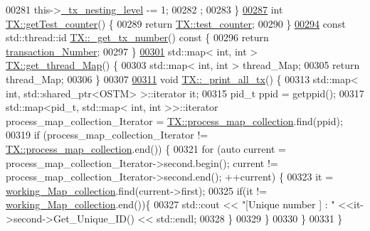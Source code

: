 \begin{DoxyCode}
00281     this->\hyperlink{class_t_x_ae8f413fd7f4fea322e7ad3c668f9898e_ae8f413fd7f4fea322e7ad3c668f9898e}{\_tx\_nesting\_level} -= 1;
00282 ;
00283 \}
\hypertarget{_t_x_8cpp_source.tex_l00287}{}\hyperlink{class_t_x_ae9bf97930c4670f59d334b345353a71e_ae9bf97930c4670f59d334b345353a71e}{00287} \textcolor{keywordtype}{int} \hyperlink{class_t_x_ae9bf97930c4670f59d334b345353a71e_ae9bf97930c4670f59d334b345353a71e}{TX::getTest\_counter}() \{
00289     \textcolor{keywordflow}{return} \hyperlink{class_t_x_a25838234aab99ae891a90eb8623a8b3c_a25838234aab99ae891a90eb8623a8b3c}{TX::test\_counter};
00290 \}
\hypertarget{_t_x_8cpp_source.tex_l00294}{}\hyperlink{class_t_x_a9eba04944d449285905b60ec47223cff_a9eba04944d449285905b60ec47223cff}{00294} \textcolor{keyword}{const} std::thread::id \hyperlink{class_t_x_a9eba04944d449285905b60ec47223cff_a9eba04944d449285905b60ec47223cff}{TX::\_get\_tx\_number}()\textcolor{keyword}{ const }\{
00296     \textcolor{keywordflow}{return} \hyperlink{class_t_x_a145a1c74b521f277fe481971a930b249_a145a1c74b521f277fe481971a930b249}{transaction\_Number};
00297 \}
\hypertarget{_t_x_8cpp_source.tex_l00301}{}\hyperlink{class_t_x_a3f5671423cb7b9f9c98f8a25f2a4b545_a3f5671423cb7b9f9c98f8a25f2a4b545}{00301} std::map< int, int > \hyperlink{class_t_x_a3f5671423cb7b9f9c98f8a25f2a4b545_a3f5671423cb7b9f9c98f8a25f2a4b545}{TX::get\_thread\_Map}() \{
00303     std::map< int, int > thread\_Map;
00305     \textcolor{keywordflow}{return} thread\_Map;
00306 \}
00307 
\hypertarget{_t_x_8cpp_source.tex_l00311}{}\hyperlink{class_t_x_a3d96ed91eb9ec73e16589f705661c5a7_a3d96ed91eb9ec73e16589f705661c5a7}{00311} \textcolor{keywordtype}{void} \hyperlink{class_t_x_a3d96ed91eb9ec73e16589f705661c5a7_a3d96ed91eb9ec73e16589f705661c5a7}{TX::\_print\_all\_tx}() \{
00313     std::map< int, std::shared\_ptr<OSTM> >::iterator it;
00315     pid\_t ppid = getppid();
00317     std::map<pid\_t, std::map< int, int >>::iterator process\_map\_collection\_Iterator = 
      \hyperlink{class_t_x_a2e3cd2f52fd93cf6ef3eb3c1cb830b9f_a2e3cd2f52fd93cf6ef3eb3c1cb830b9f}{TX::process\_map\_collection}.find(ppid);
00319     \textcolor{keywordflow}{if} (process\_map\_collection\_Iterator != \hyperlink{class_t_x_a2e3cd2f52fd93cf6ef3eb3c1cb830b9f_a2e3cd2f52fd93cf6ef3eb3c1cb830b9f}{TX::process\_map\_collection}.end()) \{
00321         \textcolor{keywordflow}{for} (\textcolor{keyword}{auto} current = process\_map\_collection\_Iterator->second.begin(); current != 
      process\_map\_collection\_Iterator->second.end(); ++current) \{
00323             it = \hyperlink{class_t_x_a81aafda16e2f20e36ec6c68e584668ff_a81aafda16e2f20e36ec6c68e584668ff}{working\_Map\_collection}.find(current->first);
00325             \textcolor{keywordflow}{if}(it != \hyperlink{class_t_x_a81aafda16e2f20e36ec6c68e584668ff_a81aafda16e2f20e36ec6c68e584668ff}{working\_Map\_collection}.end())\{
00327                 std::cout << \textcolor{stringliteral}{"[Unique number ] : "} <<it->second->Get\_Unique\_ID() << std::endl;
00328             \} 
00329         \}
00330     \}
00331 \}
\end{DoxyCode}
